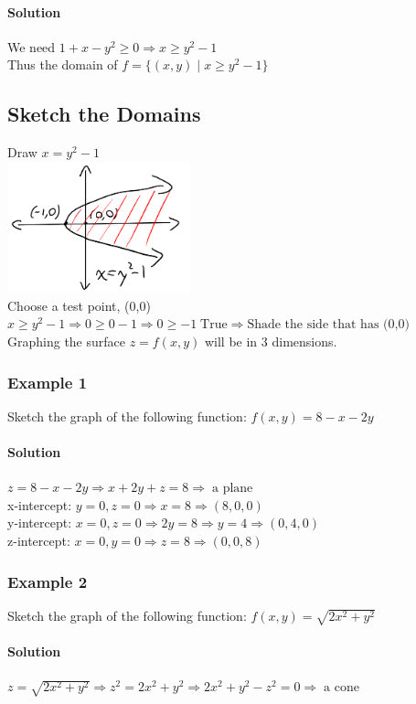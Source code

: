 \documentclass{article}
\begin{document}
\paragraph{Solution} We need $1+x-y^2\geq0\Rightarrow x\geq y^2-1$
\\Thus the domain of $f=\{(x,y)\;|\;x\geq y^2-1\}$

\subsection{Sketch the Domains}
Draw $x=y^2-1$\\
\includegraphics[width=200px]{sketch-domain.png}
\\Choose a test point, (0,0)
\\$x\geq y^2-1\Rightarrow0\geq0-1\Rightarrow0\geq-1\;\text{True}\Rightarrow \text{Shade the side that has (0,0)}$
\\Graphing the surface $z=f(x,y)$ will be in 3 dimensions.

\subsubsection{Example 1}
Sketch the graph of the following function: $f(x,y)=8-x-2y$

\paragraph{Solution} $z=8-x-2y\Rightarrow x+2y+z=8\Rightarrow\;\text{a plane}$
\\x-intercept: $y=0,z=0\Rightarrow x=8\Rightarrow(8,0,0)$
\\y-intercept: $x=0,z=0\Rightarrow 2y=8\Rightarrow y=4\Rightarrow(0,4,0)$
\\z-intercept: $x=0,y=0\Rightarrow z=8\Rightarrow(0,0,8)$

\subsubsection{Example 2}
Sketch the graph of the following function: $f(x,y)=\sqrt{2x^2+y^2}$

\paragraph{Solution} $z=\sqrt{2x^2+y^2}\Rightarrow z^2=2x^2+y^2\Rightarrow 2x^2+y^2-z^2=0\Rightarrow\;\text{a cone}$
\end{document}
